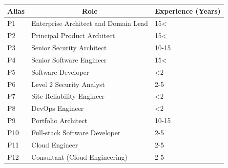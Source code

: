 \begin{table}[!hb]
\begin{tabular}{|l|l|l|}
\hline
\multicolumn{1}{|c|}{\textbf{Alias}} & \multicolumn{1}{|c|}{\textbf{Role}}                           & \multicolumn{1}{|c|}{\textbf{Experience (Years)}} \\ \hline
\multicolumn{1}{|l|}{P1}           & \multicolumn{1}{l|}{Enterprise Architect and Domain Lead}   & \multicolumn{1}{l|}{15\textless{}}             \\ \hline
\multicolumn{1}{|l|}{P2}           & \multicolumn{1}{l|}{Principal Product Architect}            & \multicolumn{1}{l|}{15\textless{}}             \\ \hline
\multicolumn{1}{|l|}{P3}           & \multicolumn{1}{l|}{Senior Security Architect}              & \multicolumn{1}{l|}{10-15}                      \\ \hline
\multicolumn{1}{|l|}{P4}           & \multicolumn{1}{l|}{Senior Software Engineer}               & \multicolumn{1}{l|}{15\textless{}}              \\ \hline
\multicolumn{1}{|l|}{P5}           & \multicolumn{1}{l|}{Software Developer}                     & \multicolumn{1}{l|}{\textless 2}                \\ \hline
\multicolumn{1}{|l|}{P6}           & \multicolumn{1}{l|}{Level 2 Security Analyst}               & \multicolumn{1}{l|}{2-5}                        \\ \hline
\multicolumn{1}{|l|}{P7}           & \multicolumn{1}{l|}{Site Reliability Engineer}              & \multicolumn{1}{l|}{\textless 2}                \\ \hline
\multicolumn{1}{|l|}{P8}           & \multicolumn{1}{l|}{DevOps Engineer}                        & \multicolumn{1}{l|}{\textless 2}                \\ \hline
\multicolumn{1}{|l|}{P9}           & \multicolumn{1}{l|}{Portfolio Architect}                    & \multicolumn{1}{l|}{10-15}                      \\ \hline
\multicolumn{1}{|l|}{P10}          & \multicolumn{1}{l|}{Full-stack Software Developer}          & \multicolumn{1}{l|}{2-5}                        \\ \hline
\multicolumn{1}{|l|}{P11}          & \multicolumn{1}{l|}{Cloud Engineer}                         & \multicolumn{1}{l|}{2-5}                        \\ \hline
\multicolumn{1}{|l|}{P12}          & \multicolumn{1}{l|}{Consultant (Cloud Engineering)}         & \multicolumn{1}{l|}{2-5}                        \\ \hline

\end{tabular}
\end{table}
